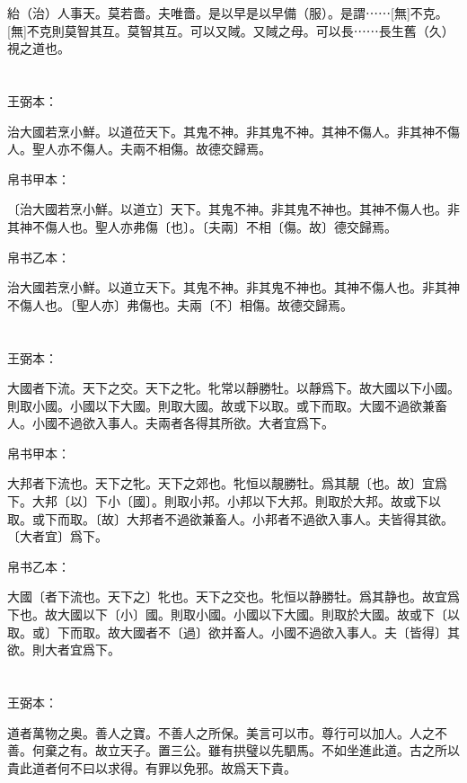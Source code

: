 \documentclass[a5paper]{ctexbook}
\begin{document}
    紿（治）人事天。莫若嗇。夫唯嗇。是以早是以早備（服）。是謂⋯⋯[無]不克。[無]不克則莫智其互。莫智其互。可以又䧕。又䧕之母。可以長⋯⋯長生舊（久）視之道也。

    \chapter{}
    王弼本：

    治大國若烹小鮮。以道莅天下。其鬼不神。非其鬼不神。其神不傷人。非其神不傷人。聖人亦不傷人。夫兩不相傷。故德交歸焉。

    
    帛书甲本：

    〔治大國若烹小鮮。以道立〕天下。其鬼不神。非其鬼不神也。其神不傷人也。非其神不傷人也。聖人亦弗傷〔也〕。〔夫兩〕不相〔傷。故〕德交歸焉。

    帛书乙本：

    治大國若烹小鮮。以道立天下。其鬼不神。非其鬼不神也。其神不傷人也。非其神不傷人也。〔聖人亦〕弗傷也。夫兩〔不〕相傷。故德交歸焉。

    \chapter{}
    王弼本：

    大國者下流。天下之交。天下之牝。牝常以靜勝牡。以靜爲下。故大國以下小國。則取小國。小國以下大國。則取大國。故或下以取。或下而取。大國不過欲兼畜人。小國不過欲入事人。夫兩者各得其所欲。大者宜爲下。

    
    帛书甲本：

    大邦者下流也。天下之牝。天下之郊也。牝恒以靚勝牡。爲其靚〔也。故〕宜爲下。大邦〔以〕下小〔國〕。則取小邦。小邦以下大邦。則取於大邦。故或下以取。或下而取。〔故〕大邦者不過欲兼畜人。小邦者不過欲入事人。夫皆得其欲。〔大者宜〕爲下。

    帛书乙本：

    大國〔者下流也。天下之〕牝也。天下之交也。牝恒以静勝牡。爲其静也。故宜爲下也。故大國以下〔小〕國。則取小國。小國以下大國。則取於大國。故或下〔以取。或〕下而取。故大國者不〔過〕欲并畜人。小國不過欲入事人。夫〔皆得〕其欲。則大者宜爲下。

    \chapter{}
    王弼本：

    道者萬物之奥。善人之寶。不善人之所保。美言可以市。尊行可以加人。人之不善。何棄之有。故立天子。置三公。雖有拱璧以先駟馬。不如坐進此道。古之所以貴此道者何不曰以求得。有罪以免邪。故爲天下貴。
\end{document}
